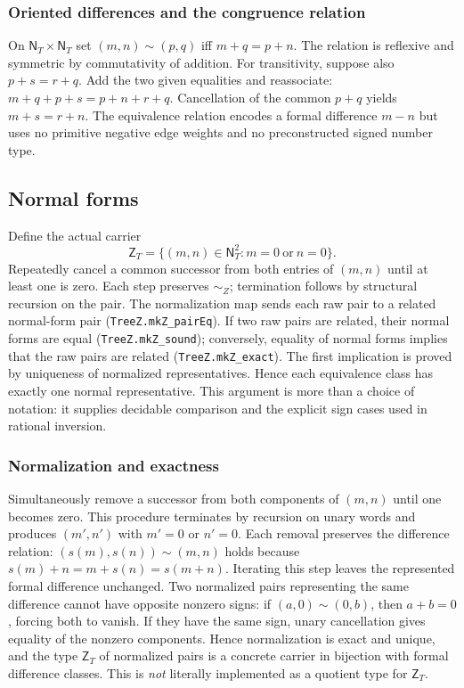 \documentclass[11pt,reqno]{amsart}
\theoremstyle{definition}\newtheorem{definition}[theorem]{Definition}
\theoremstyle{remark}\newtheorem{remark}[theorem]{Remark}
\newcommand{\N}{\mathsf N_T}\newcommand{\Z}{\mathsf Z_T}\newcommand{\Q}{\mathsf Q_T}\newcommand{\RR}{\mathsf R}
\begin{document}
\medskip
\subsubsection*{Oriented differences and the congruence relation}\label{supp:5-1}
On $\N\times\N$ set $(m,n)\sim(p,q)$ iff $m+q=p+n$. The relation is reflexive and symmetric by commutativity of addition. For transitivity, suppose also $p+s=r+q$. Add the two given equalities and reassociate: $m+q+p+s=p+n+r+q$. Cancellation of the common $p+q$ yields $m+s=r+n$. The equivalence relation encodes a formal difference $m-n$ but uses no primitive negative edge weights and no preconstructed signed number type.
\medskip

\subsection{Normal forms}\label{main:sub-11}
Define the actual carrier
\[
 \Z=\{(m,n)\in\N^2 : m=0\ \text{or}\ n=0\}.
\]
Repeatedly cancel a common successor from both entries of $(m,n)$ until at least one is zero. Each step preserves $\sim_Z$; termination follows by structural recursion on the pair. The normalization map sends each raw pair to a related normal-form pair (\texttt{TreeZ.mkZ\_pairEq}). If two raw pairs are related, their normal forms are equal (\texttt{TreeZ.mkZ\_sound}); conversely, equality of normal forms implies that the raw pairs are related (\texttt{TreeZ.mkZ\_exact}). The first implication is proved by uniqueness of normalized representatives. Hence each equivalence class has exactly one normal representative. This argument is more than a choice of notation: it supplies decidable comparison and the explicit sign cases used in rational inversion.

\medskip
\subsubsection*{Normalization and exactness}\label{supp:5-2}
Simultaneously remove a successor from both components of $(m,n)$ until one becomes zero. This procedure terminates by recursion on unary words and produces $(m',n')$ with $m'=0$ or $n'=0$. Each removal preserves the difference relation: $(s(m),s(n))\sim(m,n)$ holds because $s(m)+n=m+s(n)=s(m+n)$. Iterating this step leaves the represented formal difference unchanged. Two normalized pairs representing the same difference cannot have opposite nonzero signs: if $(a,0)\sim(0,b)$, then $a+b=0$, forcing both to vanish. If they have the same sign, unary cancellation gives equality of the nonzero components. Hence normalization is exact and unique, and the type $\Z$ of normalized pairs is a concrete carrier in bijection with formal difference classes. This is \emph{not} literally implemented as a quotient type for $\Z$.
\medskip
\end{document}
